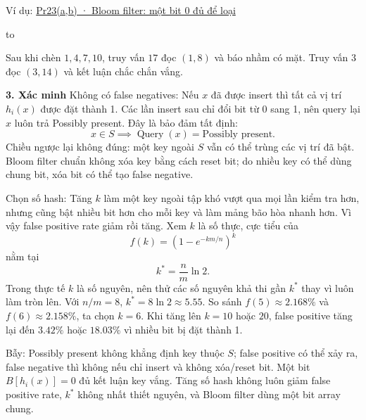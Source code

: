 \documentclass[10pt,a4paper,twocolumn]{article}
\newcommand{\key}[1]{#1:\enspace}
\newcommand{\blocklabel}[1]{\par\noindent#1\par\nobreak}
\newcommand{\qlink}[2]{\hyperref[question:#1]{#2}}
\newenvironment{example}[2]{%
  \par\addvspace{6pt}\noindent
  \raggedright
  \blocklabel{Ví dụ: \qlink{#1}{#2}}%
}{\par\addvspace{4pt}}
\newenvironment{diagram}{%
  \par\addvspace{3pt}\noindent\hbox to \linewidth\bgroup\hfil
}{\hfil\egroup\par\addvspace{3pt}}
\newcommand{\unitheading}[2]{%
  \par\addvspace{1pt}\noindent\textbf{#1. #2}\enspace}
\newcommand{\unitverification}{\unitheading{3}{Xác minh}}
\begin{document}
\begin{example}{Pr23}{Pr23(a,b) · Bloom filter: một bit 0 đủ để loại}
\begin{diagram}
\end{diagram}
Sau khi chèn $1,4,7,10$, truy vấn $17$ đọc $(1,8)$ và báo nhầm có mặt. Truy vấn $3$ đọc $(3,14)$ và kết luận chắc chắn vắng.
\end{example}


\unitverification
\key{Không có false negatives} Nếu $x$ đã được insert thì tất cả vị trí $h_i(x)$ được đặt thành 1. Các lần insert sau chỉ đổi bit từ 0 sang 1, nên query lại $x$ luôn trả Possibly present. Đây là bảo đảm tất định:
\[
x\in S\implies\operatorname{Query}(x)=\text{Possibly present}.
\]
Chiều ngược lại không đúng: một key ngoài $S$ vẫn có thể trùng các vị trí đã bật. Bloom filter chuẩn không xóa key bằng cách reset bit; do nhiều key có thể dùng chung bit, xóa bit có thể tạo false negative.

\key{Chọn số hash} Tăng $k$ làm một key ngoài tập khó vượt qua mọi lần kiểm tra hơn, nhưng cũng bật nhiều bit hơn cho mỗi key và làm mảng bão hòa nhanh hơn. Vì vậy false positive rate giảm rồi tăng. Xem $k$ là số thực, cực tiểu của
\[
f(k)=\left(1-e^{-km/n}\right)^k
\]
nằm tại
\[
\boxed{k^*=\frac{n}{m}\ln2}.
\]
Trong thực tế $k$ là số nguyên, nên thử các số nguyên khả thi gần $k^*$ thay vì luôn làm tròn lên. Với $n/m=8$, $k^*=8\ln 2\approx5.55$. So sánh $f(5)\approx2.168\%$ và $f(6)\approx2.158\%$, ta chọn $k=6$. Khi tăng lên $k=10$ hoặc $20$, false positive tăng lại đến $3.42\%$ hoặc $18.03\%$ vì nhiều bit bị đặt thành 1.

\key{Bẫy} Possibly present không khẳng định key thuộc $S$; false positive có thể xảy ra, false negative thì không nếu chỉ insert và không xóa/reset bit. Một bit $B[h_i(x)]=0$ đủ kết luận key vắng. Tăng số hash không luôn giảm false positive rate, $k^*$ không nhất thiết nguyên, và Bloom filter dùng một bit array chung.
\end{document}

